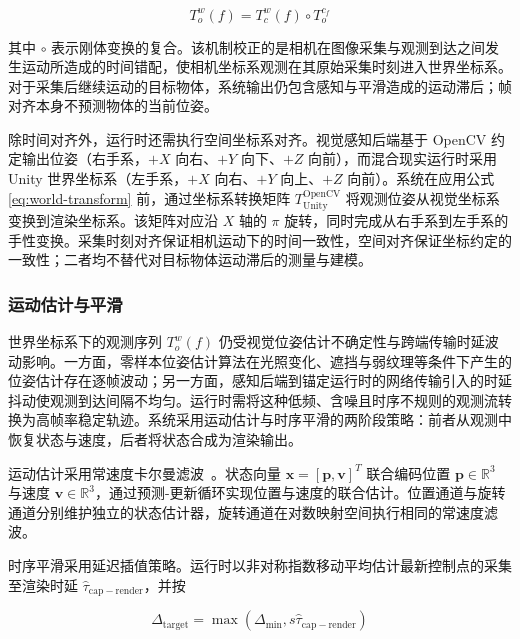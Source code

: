 \documentclass[review]{vgtc}
\begin{document}
\begin{equation}
T_o^w (f) = T_c^w (f) \circ T_o^{c_f}
\label{eq:world-transform}
\end{equation}


其中 $\circ$ 表示刚体变换的复合。该机制校正的是相机在图像采集与观测到达之间发生运动所造成的时间错配，使相机坐标系观测在其原始采集时刻进入世界坐标系。对于采集后继续运动的目标物体，系统输出仍包含感知与平滑造成的运动滞后；帧对齐本身不预测物体的当前位姿。

除时间对齐外，运行时还需执行空间坐标系对齐。视觉感知后端基于 OpenCV 约定输出位姿（右手系，$+X$ 向右、$+Y$ 向下、$+Z$ 向前），而混合现实运行时采用 Unity 世界坐标系（左手系，$+X$ 向右、$+Y$ 向上、$+Z$ 向前）。系统在应用公式 \ref{eq:world-transform} 前，通过坐标系转换矩阵 $T_{\mathrm{Unity}}^{\mathrm{OpenCV}}$ 将观测位姿从视觉坐标系变换到渲染坐标系。该矩阵对应沿 $X$ 轴的 $\pi$ 旋转，同时完成从右手系到左手系的手性变换。采集时刻对齐保证相机运动下的时间一致性，空间对齐保证坐标约定的一致性；二者均不替代对目标物体运动滞后的测量与建模。

\subsubsection{运动估计与平滑}\label{sec:smoothing}


世界坐标系下的观测序列 ${T_o^w (f)}$ 仍受视觉位姿估计不确定性与跨端传输时延波动影响。一方面，零样本位姿估计算法在光照变化、遮挡与弱纹理等条件下产生的位姿估计存在逐帧波动；另一方面，感知后端到锚定运行时的网络传输引入的时延抖动使观测到达间隔不均匀。运行时需将这种低频、含噪且时序不规则的观测流转换为高帧率稳定轨迹。系统采用运动估计与时序平滑的两阶段策略：前者从观测中恢复状态与速度，后者将状态合成为渲染输出。

运动估计采用常速度卡尔曼滤波~\cite{kalman1960new}。状态向量 $\mathbf{x} = [\mathbf{p}, \mathbf{v}]^T$ 联合编码位置 $\mathbf{p} \in \mathbb{R}^3$ 与速度 $\mathbf{v} \in \mathbb{R}^3$，通过预测-更新循环实现位置与速度的联合估计。位置通道与旋转通道分别维护独立的状态估计器，旋转通道在对数映射空间执行相同的常速度滤波。

时序平滑采用延迟插值策略。运行时以非对称指数移动平均估计最新控制点的采集至渲染时延 $\widehat{\tau}_{\mathrm{cap-render}}$，并按

\begin{equation}
\Delta_{\mathrm{target}} = \max\!\left(\Delta_{\mathrm{min}}, s \widehat{\tau}_{\mathrm{cap-render}}\right)
\label{eq:adaptive-delay}
\end{equation}
\end{document}
